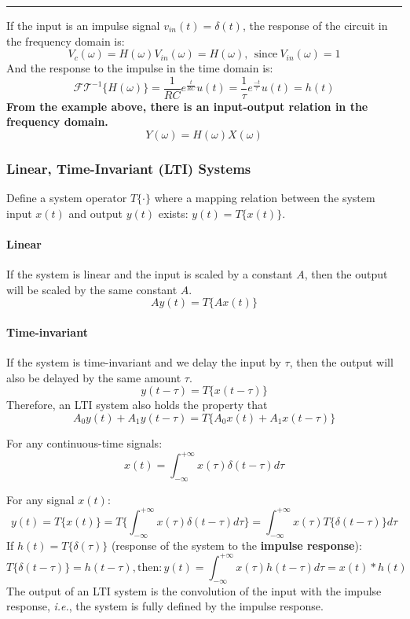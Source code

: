 \begin{ex}{}
\vspace{0.5cm}
\hrule
\vspace{0.5cm}

If the input is an impulse signal $v_{in}(t) = \delta(t)$, the response of the circuit in the frequency domain is:
\[ 
V_{c}(\omega)  = H(\omega)V_{in}(\omega) = H(\omega), \ \ \text{since} \ V_{in}(\omega)=1
\]
And the response to the impulse in the time domain is:
\[ 
\mathcal{FT}^{-1}\{ H(\omega) \} = \frac{1}{RC} e^{\frac{t}{RC}} u(t) = \frac{1}{\tau} e^{\frac{-t}{\tau}} u(t) = h(t) 
\]
\textbf{From the example above, there is an input-output relation in the frequency domain.}
\[ 
Y(\omega) =  H(\omega)  X(\omega) 
\]
\end{ex}

\subsubsection{Linear, Time-Invariant (LTI) Systems}
\begin{tcolorbox}[title = Definition of LTI systems]
Define a system operator $T\{ \cdot \}$ where a mapping relation between the system input $x(t)$ and output $y(t)$ exists: $y(t) = T\{x(t)\}$.

\paragraph{Linear} If the system is linear and the input is scaled by a constant $A$, then the output will be scaled by the same constant $A$.
\[
    Ay(t) = T\{ Ax(t) \}
\]
\paragraph{Time-invariant} If the system is time-invariant and we delay the input by $\tau$, then the output will also be delayed by the same amount $\tau$. 
\[
     y(t-\tau) = T\{ x(t-\tau) \}
\]
Therefore, an LTI system also holds the property that
\[
    A_0 y(t) + A_1 y(t-\tau) = T\{ A_0 x(t) + A_1 x(t-\tau) \}
\]
\end{tcolorbox}

For any continuous-time signals:
\[ x(t) = \int_{-\infty}^{+\infty} x(\tau) \delta(t-\tau)d\tau \]

For any signal $x(t)$:
\[ 
    y(t) = T\{x(t)\} = T \bigg\{ \int_{-\infty}^{+\infty} x(\tau)\delta(t-\tau) d\tau \bigg\} = \int_{-\infty}^{+\infty} x(\tau)T\bigg\{\delta(t-\tau) \bigg\} d\tau 
\]
If  $h(t) = T\{\delta(\tau)\} $ (response of the system to the \textbf{impulse response}):
\[ 
    T\{\delta(t-\tau)\} = h(t-\tau), \text{then}: y(t) = \int_{-\infty}^{+\infty} x(\tau)h(t-\tau)d\tau = x(t)*h(t) 
\]
The output of an LTI system is the convolution of the input with the impulse response, \textit{i.e.}, the system is fully defined by the impulse response. \\

